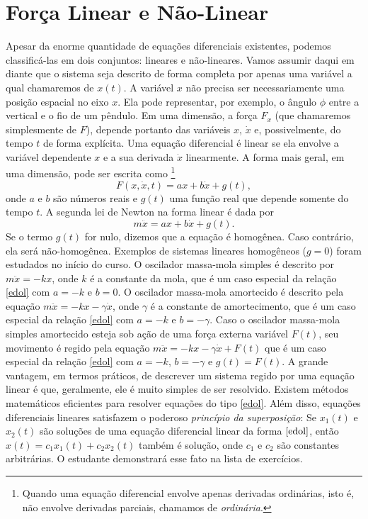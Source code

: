 \documentclass{article}
\begin{document}
\section{Força Linear e Não-Linear}

Apesar da enorme quantidade de equações diferenciais existentes, podemos classificá-las em dois conjuntos: lineares e não-lineares. Vamos assumir daqui em diante que o sistema seja descrito de forma completa por apenas uma variável a qual chamaremos de $x(t)$. A variável $x$ não precisa ser necessariamente uma posição espacial no eixo $x$. Ela pode representar, por exemplo, o ângulo $\phi$ entre a vertical e o fio de um pêndulo. Em uma dimensão, a força $F_x$ (que chamaremos simplesmente de $F$), depende portanto das variáveis $x$, $\dot{x}$ e, possivelmente, do tempo $t$ de forma explícita. Uma equação diferencial é linear se ela envolve a variável dependente $x$ e a sua derivada $\dot{x}$ linearmente. A forma mais geral, em uma dimensão, pode ser escrita como \footnote{Quando uma equação diferencial envolve apenas derivadas ordinárias, isto é, não envolve derivadas parciais, chamamos de \textit{ordinária}.}
\begin{equation}
    F(x,\dot{x},t) = ax + b\dot{x} + g(t),
    \label{linear}
\end{equation}
onde $a$ e $b$ são números reais e $g(t)$ uma função real que depende somente do tempo $t$. A segunda lei de Newton na forma linear é dada por
\begin{equation}
    m\ddot{x} = ax + b\dot{x} + g(t).
    \label{edol}
\end{equation}
Se o termo $g(t)$ for nulo, dizemos que a equação é homogênea. Caso contrário, ela será não-homogênea. Exemplos de sistemas lineares homogêneos ($g =0$) foram estudados no início do curso. O oscilador massa-mola simples é descrito por $m\ddot{x} = -kx$, onde $k$ é a constante da mola, que é um caso especial da relação \eqref{edol} com $a = -k$ e $b = 0$. O oscilador massa-mola amortecido é descrito pela equação $m\ddot{x} = -kx-\gamma\dot{x}$, onde $\gamma$ é a constante de amortecimento, que é um caso especial da relação \eqref{edol} com $a=-k$ e $b = -\gamma$. Caso o oscilador massa-mola simples amortecido esteja sob ação de uma força externa variável $F(t)$, seu movimento é regido pela equação $m\ddot{x} = -kx-\gamma\dot{x} + F(t)$ que é um caso especial da relação \eqref{edol} com $a = -k$, $b = -\gamma$ e $g(t) = F(t)$. A grande vantagem, em termos práticos, de descrever um sistema regido por uma equação linear é que, geralmente, ele é muito simples de ser resolvido. Existem métodos matemáticos eficientes para resolver equações do tipo \eqref{edol}. Além disso, equações diferenciais lineares satisfazem o poderoso \textit{princípio da superposição}: Se $x_1(t)$ e $x_2(t)$ são soluções de uma equação diferencial linear da forma $\eqref{edol}$, então $x(t) = c_1 x_1(t) + c_2 x_2(t)$ também é solução, onde $c_1$ e $c_2$ são constantes arbitrárias. O estudante demonstrará esse fato na lista de exercícios.
\end{document}
